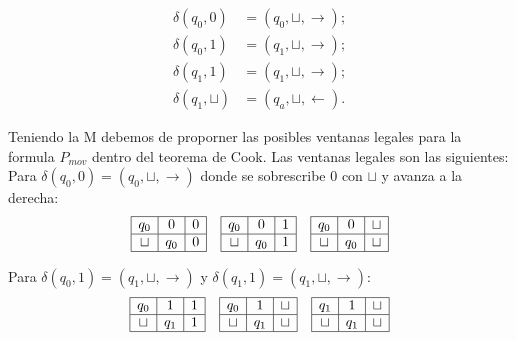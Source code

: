 \[
\begin{aligned}
\delta(q_0, 0) &= (q_0, \sqcup, \rightarrow); \\
\delta(q_0, 1) &= (q_1, \sqcup, \rightarrow); \\
\delta(q_1, 1) &= (q_1, \sqcup, \rightarrow); \\
\delta(q_1, \sqcup) &= (q_a, \sqcup, \leftarrow).
\end{aligned}
\]

Teniendo la M debemos de proporner las posibles ventanas legales para la formula $P_{mov}$ dentro del teorema de Cook. Las ventanas legales son las siguientes:\\

Para $\delta(q_0, 0) = (q_0, \sqcup, \rightarrow)$ donde se sobrescribe $0$ con $\sqcup$ y avanza a la derecha:$$\begin{array}{ccc} \begin{array}{|c|c|c|} \hline q_0 & 0 & 0 \\ \hline \sqcup & q_0 & 0 \\ \hline \end{array} & \begin{array}{|c|c|c|} \hline q_0 & 0 & 1 \\ \hline \sqcup & q_0 & 1 \\ \hline \end{array} & \begin{array}{|c|c|c|} \hline q_0 & 0 & \sqcup \\ \hline \sqcup & q_0 & \sqcup \\ \hline \end{array} \end{array}$$


Para $\delta(q_0, 1) = (q_1, \sqcup, \rightarrow)$ y $\delta(q_1, 1) = (q_1, \sqcup, \rightarrow)$:$$\begin{array}{ccc} \begin{array}{|c|c|c|} \hline q_0 & 1 & 1 \\ \hline \sqcup & q_1 & 1 \\ \hline \end{array} & \begin{array}{|c|c|c|} \hline q_0 & 1 & \sqcup \\ \hline \sqcup & q_1 & \sqcup \\ \hline \end{array} & \begin{array}{|c|c|c|} \hline q_1 & 1 & \sqcup \\ \hline \sqcup & q_1 & \sqcup \\ \hline \end{array} \end{array}$$

